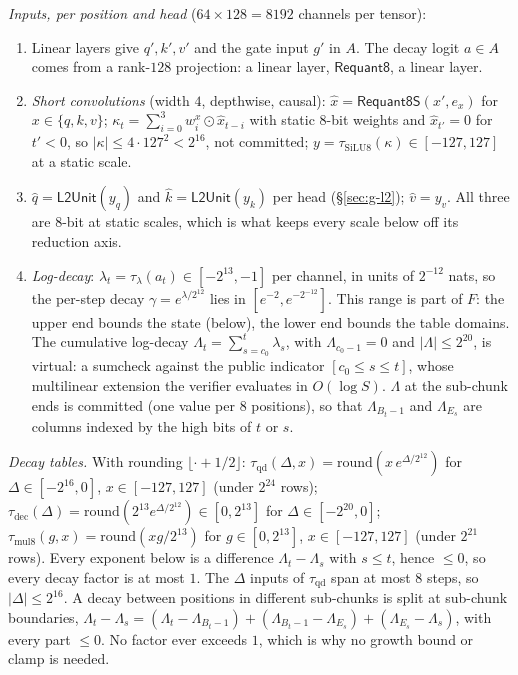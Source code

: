 \documentclass[11pt]{article}
\begin{document}
\emph{Inputs, per position and head} (\(64 \times 128 = 8192\) channels per tensor):
\begin{enumerate}
\item Linear layers give \(q', k', v'\) and the gate input \(g'\) in \(A\). The decay logit \(a \in A\) comes from a rank-\(128\) projection: a linear layer, \(\mathsf{Requant8}\), a linear layer.
\item \emph{Short convolutions} (width \(4\), depthwise, causal): \(\hat x = \mathsf{Requant8S}(x', e_x)\) for \(x \in \{q, k, v\}\); \(\kappa_t = \sum_{i=0}^{3} w^{x}_{i} \odot \hat x_{t-i}\) with static \(8\)-bit weights and \(\hat x_{t'} = 0\) for \(t' < 0\), so \(|\kappa| \le 4\cdot 127^2 < 2^{16}\), not committed; \(y = \tau_{\mathrm{SiLU8}}(\kappa) \in [-127, 127]\) at a static scale.
\item \(\hat q = \mathsf{L2Unit}(y_q)\) and \(\hat k = \mathsf{L2Unit}(y_k)\) per head (\S\ref{sec:g-l2}); \(\hat v = y_v\). All three are \(8\)-bit at static scales, which is what keeps every scale below off its reduction axis.
\item \emph{Log-decay}: \(\lambda_t = \tau_\lambda(a_t) \in [-2^{13}, -1]\) per channel, in units of \(2^{-12}\) nats, so the per-step decay \(\gamma = e^{\lambda/2^{12}}\) lies in \([e^{-2}, e^{-2^{-12}}]\). This range is part of \(F\): the upper end bounds the state (below), the lower end bounds the table domains.
The cumulative log-decay \(\Lambda_t = \sum_{s=c_0}^{t} \lambda_s\), with \(\Lambda_{c_0 - 1} = 0\) and \(|\Lambda| \le 2^{20}\), is virtual: a sumcheck against the public indicator \([c_0 \le s \le t]\), whose multilinear extension the verifier evaluates in \(O(\log S)\).
\(\Lambda\) at the sub-chunk ends is committed (one value per \(8\) positions), so that \(\Lambda_{B_t - 1}\) and \(\Lambda_{E_s}\) are columns indexed by the high bits of \(t\) or \(s\).
\end{enumerate}

\emph{Decay tables.} With rounding \(\lfloor \cdot + 1/2 \rfloor\):
\(\tau_{\mathrm{qd}}(\Delta, x) = \mathrm{round}(x\, e^{\Delta/2^{12}})\) for \(\Delta \in [-2^{16}, 0]\), \(x \in [-127, 127]\) (under \(2^{24}\) rows);
\(\tau_{\mathrm{dec}}(\Delta) = \mathrm{round}(2^{13} e^{\Delta/2^{12}}) \in [0, 2^{13}]\) for \(\Delta \in [-2^{20}, 0]\);
\(\tau_{\mathrm{mul8}}(g, x) = \mathrm{round}(x g / 2^{13})\) for \(g \in [0, 2^{13}]\), \(x \in [-127, 127]\) (under \(2^{21}\) rows).
Every exponent below is a difference \(\Lambda_t - \Lambda_s\) with \(s \le t\), hence \(\le 0\), so every decay factor is at most \(1\).
The \(\Delta\) inputs of \(\tau_{\mathrm{qd}}\) span at most \(8\) steps, so \(|\Delta| \le 2^{16}\).
A decay between positions in different sub-chunks is split at sub-chunk boundaries, \(\Lambda_t - \Lambda_s = (\Lambda_t - \Lambda_{B_t - 1}) + (\Lambda_{B_t - 1} - \Lambda_{E_s}) + (\Lambda_{E_s} - \Lambda_s)\), with every part \(\le 0\).
No factor ever exceeds \(1\), which is why no growth bound or clamp is needed.
\end{document}
